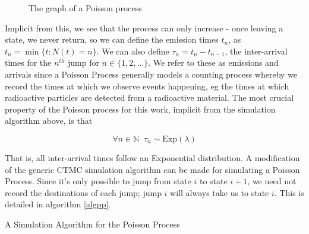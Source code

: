 \begin{figure}[h]
\centering
{}
\caption{The graph of a Poisson process}\label{poisson_graph}
\end{figure}

Implicit from this, we see that the process can only increase - once leaving a state, we never return, so we can define the emission times $t_n$, as $t_n = \min\{t : N(t)= n\}$. We can also define $\tau_n = t_n-t_{n-1}$, the inter-arrival times for the $n^{th}$ jump for $n \in \{1,2,...\}$. We refer to these as emissions and arrivals since a Poisson Process generally models a counting process whereby we record the times at which we observe events happening, eg the times at which radioactive particles are detected from a radioactive material. The most crucial property of the Poisson process for this work, implicit from the simulation algorithm above, is that

$$
\forall n \in \mathbb{N} \; \; \tau_n \sim \mathrm{Exp}(\lambda)
$$

That is, all inter-arrival times follow an Exponential distribution. A modification of the generic CTMC simulation algorithm can be made for simulating  a Poisson Process. Since it's only possible to jump from state $i$ to state $i+1$, we need not record the destinations of each jump; jump $i$ will always take us to state $i$. This is detailed in algorithm \ref{algpp}.

\begin{algorithm}
\SetAlgoLined
{}

\caption{A Simulation Algorithm for the Poisson Process}\label{algpp}

\end{algorithm}

